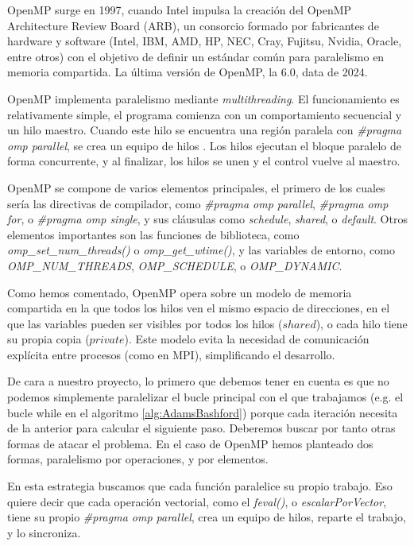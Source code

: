 OpenMP surge en 1997, cuando Intel impulsa la creación del OpenMP Architecture Review Board (ARB), un consorcio formado por fabricantes de hardware y software (Intel, IBM, AMD, HP, NEC, Cray, Fujitsu, Nvidia, Oracle, entre otros) con el objetivo de definir un estándar común para paralelismo en memoria compartida. La última versión de OpenMP, la 6.0, data de 2024.

OpenMP implementa paralelismo mediante \textit{multithreading}. El funcionamiento es relativamente simple, el programa comienza con un comportamiento secuencial y un hilo maestro. Cuando este hilo se encuentra una región paralela con \textit{\#pragma omp parallel}, se crea un equipo de hilos \cite{Arb2024}. Los hilos ejecutan el bloque paralelo de forma concurrente, y al finalizar, los hilos se unen y el control vuelve al maestro.

OpenMP se compone de varios elementos principales, el primero de los cuales sería las directivas de compilador, como \textit{\#pragma omp parallel}, \textit{\#pragma omp for}, o \textit{\#pragma omp single}, y sus cláusulas como \textit{schedule}, \textit{shared}, o \textit{default}. Otros elementos importantes son las funciones de biblioteca, como \textit{omp\_set\_num\_threads()} o \textit{omp\_get\_wtime()}, y las variables de entorno, como \textit{OMP\_NUM\_THREADS}, \textit{OMP\_SCHEDULE}, o \textit{OMP\_DYNAMIC}. \cite{Arb2024}

Como hemos comentado, OpenMP opera sobre un modelo de memoria compartida en la que todos los hilos ven el mismo espacio de direcciones, en el que las variables pueden ser visibles por todos los hilos ($shared$), o cada hilo tiene su propia copia ($private$). Este modelo evita la necesidad de comunicación explícita entre procesos (como en MPI), simplificando el desarrollo. \cite{Jin1997}

De cara a nuestro proyecto, lo primero que debemos tener en cuenta es que no podemos simplemente paralelizar el bucle principal con el que trabajamos (e.g. el bucle while en el algoritmo \ref{alg:AdamsBashford}) porque cada iteración necesita de la anterior para calcular el siguiente paso. Deberemos buscar por tanto otras formas de atacar el problema. En el caso de OpenMP hemos planteado dos formas, paralelismo por operaciones, y por elementos.


En esta estrategia buscamos que cada función paralelice su propio trabajo. Eso quiere decir que cada operación vectorial, como el \textit{feval()}, o \textit{escalarPorVector}, tiene su propio \textit{\#pragma omp parallel}, crea un equipo de hilos, reparte el trabajo, y lo sincroniza.

